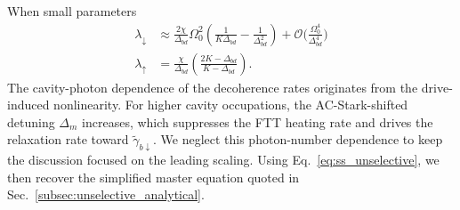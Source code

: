 When small parameters
\begin{align}
\lambda_\downarrow &\approx \frac{2\chi}{\Delta_{bd}} \Omega_0^2 \left( \frac{1}{K\Delta_{bd}} - \frac{1}{\Delta_{bd}^2} \right) + \mathcal{O}\bigg(\frac{\Omega^4_0}{\Delta^4_{bd}}\bigg) \\
\lambda_\uparrow &= \frac{\chi}{\Delta_{bd}} \left( \frac{2K - \Delta_{bd}}{K - \Delta_{bd}} \right).
\end{align}
The cavity-photon dependence of the decoherence rates originates from the drive-induced nonlinearity. For higher cavity occupations, the AC-Stark-shifted detuning $\Delta_m$ increases, which suppresses the FTT heating rate and drives the relaxation rate toward $\widetilde{\gamma}_{b\downarrow}$. We neglect this photon-number dependence to keep the discussion focused on the leading scaling. Using Eq.~\eqref{eq:ss_unselective}, we then recover the simplified master equation quoted in Sec.~\ref{subsec:unselective_analytical}.

